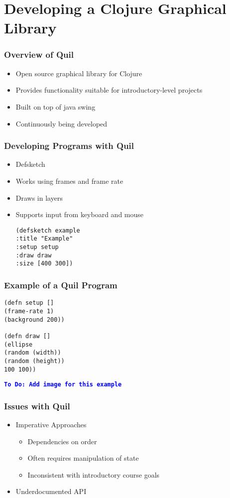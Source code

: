 \documentclass{beamer}
\newcommand{\comment}[1]{{\bf \tt  {#1}}}
\newcommand{\todo}[1]{\textcolor{blue}{\comment{To Do: {#1}}}}
\begin{document}
\section{Developing a Clojure Graphical Library}

\begin{frame}
\frametitle{Overview of Quil}
\begin{itemize}
\item Open source graphical library for Clojure
\item Provides functionality suitable for introductory-level projects
\item Built on top of java swing
\item Continuously being developed
\end{itemize}
\end{frame}

\begin{frame}[fragile]
\frametitle{Developing Programs with Quil}
\begin{itemize}
\item Defsketch
\item Works using frames and frame rate
\item Draws in layers
\item Supports input from keyboard and mouse
\begin{verbatim}
(defsketch example 
:title "Example"
:setup setup
:draw draw
:size [400 300])
\end{verbatim}
\end{itemize}
\end{frame}

\begin{frame}[fragile]
\frametitle{Example of a Quil Program}
\begin{verbatim}
(defn setup []
(frame-rate 1)
(background 200))

(defn draw []
(ellipse
(random (width))
(random (height))
100 100))
\end{verbatim}
\todo{Add image for this example}
\end{frame}

\begin{frame}
\frametitle{Issues with Quil}
\begin{itemize}
\item Imperative Approaches
	\begin{itemize}
		\item Dependencies on order
		\item Often requires manipulation of state
		\item Inconsistent with introductory course goals
	\end{itemize}
\item Underdocumented API
\end{itemize}
\end{frame}
\end{document}
